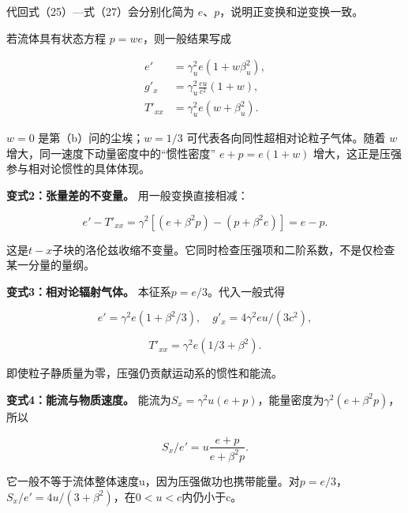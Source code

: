 \documentclass[12pt,a4paper,UTF8]{ctexart}
\begin{document}
代回式（25）---式（27）会分别化简为
\(e\)、\(p\)，说明正变换和逆变换一致。

若流体具有状态方程 \(p=w e\)，则一般结果写成

\[
\begin{aligned}
e'&=\gamma_u^2e(1+w\beta_u^2),\\
g'_x&=\gamma_u^2\frac{eu}{c^2}(1+w),\\
T'_{xx}&=\gamma_u^2e(w+\beta_u^2).
\end{aligned}
\]

\(w=0\) 是第（b）问的尘埃；\(w=1/3\)
可代表各向同性超相对论粒子气体。随着 \(w\)
增大，同一速度下动量密度中的``惯性密度'' \(e+p=e(1+w)\)
增大，这正是压强参与相对论惯性的具体体现。

\textbf{变式2：张量差的不变量。} 用一般变换直接相减：

\[e'-T'_{xx}=\gamma^2[(e+\beta^2p)-(p+\beta^2e)]=e-p.\]

这是\(t-x\)子块的洛伦兹收缩不变量。它同时检查压强项和二阶系数，不是仅检查某一分量的量纲。

\textbf{变式3：相对论辐射气体。} 本征系\(p=e/3\)。代入一般式得

\[e'=\gamma^2e(1+\beta^2/3),\quad g'_x=4\gamma^2eu/(3c^2),\]

\[T'_{xx}=\gamma^2e(1/3+\beta^2).\]

即使粒子静质量为零，压强仍贡献运动系的惯性和能流。

\textbf{变式4：能流与物质速度。}
能流为\(S_x=\gamma^2u(e+p)\)，能量密度为\(\gamma^2(e+\beta^2p)\)，所以

\[S_x/e'=u\frac{e+p}{e+\beta^2p}.\]

它一般不等于流体整体速度u，因为压强做功也携带能量。对\(p=e/3\)，\(S_x/e'=4u/(3+\beta^2)\)，在\(0<u<c\)内仍小于c。
\end{document}
